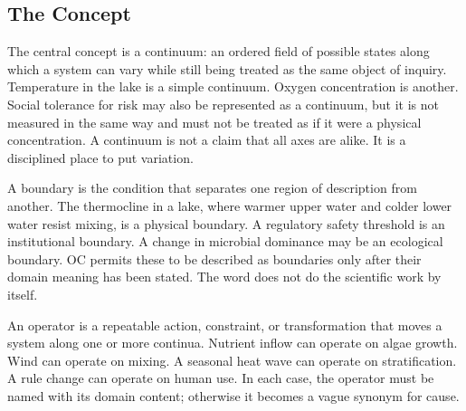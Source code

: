 \documentclass[11pt,a4paper,openany]{book}
\begin{document}
\subsection{The Concept}
The central concept is a continuum: an ordered field of possible states along which a system can vary while still being treated as the same object of inquiry. Temperature in the lake is a simple continuum. Oxygen concentration is another. Social tolerance for risk may also be represented as a continuum, but it is not measured in the same way and must not be treated as if it were a physical concentration. A continuum is not a claim that all axes are alike. It is a disciplined place to put variation. \cite{wilson_renormalization,landau_stat_physics}\par
A boundary is the condition that separates one region of description from another. The thermocline in a lake, where warmer upper water and colder lower water resist mixing, is a physical boundary. A regulatory safety threshold is an institutional boundary. A change in microbial dominance may be an ecological boundary. OC permits these to be described as boundaries only after their domain meaning has been stated. The word does not do the scientific work by itself.\par
An operator is a repeatable action, constraint, or transformation that moves a system along one or more continua. Nutrient inflow can operate on algae growth. Wind can operate on mixing. A seasonal heat wave can operate on stratification. A rule change can operate on human use. In each case, the operator must be named with its domain content; otherwise it becomes a vague synonym for cause.\par
\end{document}
